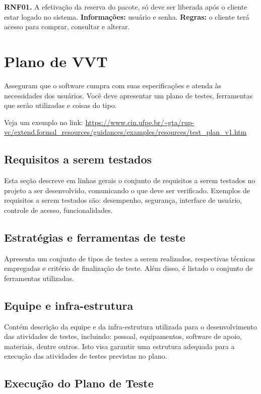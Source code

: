 \documentclass[a4paper, 12pt]{article}
\begin{document}
\textbf{RNF01.} A efetivação da reserva do pacote, só deve ser liberada após o cliente estar
logado no sistema.
\textbf{Informações:} usuário e senha.
\textbf{Regras:} o cliente terá acesso para comprar, consultar e alterar.

\section{Plano de VVT}
Asseguram que o software cumpra com suas especificações e atenda às necessidades dos usuários. Você deve apresentar um plano de testes, ferramentas que serão utilizadas e coisas do tipo.

Veja um exemplo no link: 
\url{https://www.cin.ufpe.br/~gta/rup-vc/extend.formal_resources/guidances/examples/resources/test_plan_v1.htm}

\subsection{Requisitos a serem testados}
Esta seção descreve em linhas gerais o conjunto de requisitos a serem testados no projeto a ser desenvolvido, comunicando o que deve ser verificado. Exemplos de requisitos a serem testados são: desempenho, segurança, interface de usuário, controle de acesso, funcionalidades.

\subsection{Estratégias e ferramentas de teste}
Apresenta um conjunto de tipos de testes a serem realizados, respectivas técnicas empregadas e critério de finalização de teste. Além disso, é listado o conjunto de ferramentas utilizadas.

\subsection{ Equipe e infra-estrutura}
Contém descrição da equipe e da infra-estrutura utilizada para o desenvolvimento das atividades de testes, incluindo: pessoal, equipamentos, software de apoio, materiais, dentre outros. Isto visa garantir uma estrutura adequada para a execução das atividades de testes previstas no plano.

\subsection{Execução do Plano de Teste}
\end{document}
